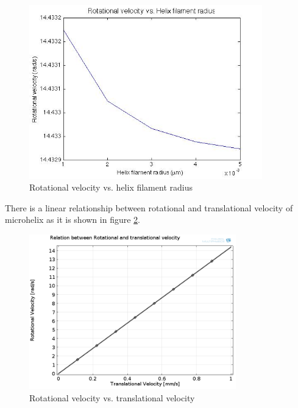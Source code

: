 \documentclass[12pt,a4paper,titlepage]{report}
\begin{document}
\begin{figure}
  \centering
    \includegraphics[width=0.90\textwidth]{RV_filamentRadius}
  \caption[Rotational velocity vs. helix filament radius]{Rotational velocity vs. helix filament radius }
  \label{RV_filamentRadius}
\end{figure}

There is a linear relationship between rotational and translational velocity of microhelix as it is shown 
in figure \ref{Rotational velocity vs. translational velocity}.



\begin{figure}
  \centering
    \includegraphics[width=0.80\textwidth]{Trans_Rot_}
  \caption[Rotational velocity vs. translational velocity]{Rotational velocity vs. translational velocity}
  \label{Rotational velocity vs. translational velocity}
\end{figure}
\end{document}

